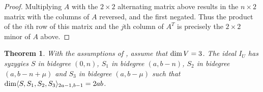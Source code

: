 \documentclass[reqno]{amsart}
\newtheorem{thm}{Theorem}[section]
\numberwithin{equation}{section}
\theoremstyle{definition}
\def\dim{\mathop{\rm dim}}
\begin{document}
\begin{proof}
Multiplying $A$ with the $2\times 2$ alternating matrix above results in the $n\times 2$ matrix with the columns of $A$ reversed, and the first negated. Thus the product of the $i$th row of this matrix and the $j$th column of $A^T$ is precisely the $2\times 2$ minor of $A$ above.    
\end{proof}




\begin{thm}\label{dim V = 3 - main theorem}
With the assumptions of , assume that $\dim V=3$. The ideal $I_U$ has syzygies $S$ in bidegree $(0,n)$, $S_1$ in bidegree $(a,b-n)$, $S_2$ in bidegree $(a,b-n+\mu)$ and $S_3$ in bidegree $(a,b-\mu)$ such that $\dim \langle S,S_1,S_2,S_3\rangle_{2a-1,b-1} = 2ab$.    
\end{thm}
\end{document}

